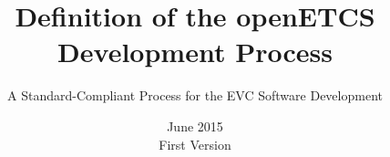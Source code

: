 \documentclass{template/openetcs_article}
\begin{document}
\frontmatter
{}



\newcommand{\nl}{\mbox{}\\}

\newcommand{\nthng}[1]{}

\newcommand{\oldtext}[1]{\textbf{OLD:} {\em #1} \textbf{DLO}}

\newcommand{\cmmnt}[1]{\fbox{#1}}

\newcommand{\bgcmmnt}[1]{\nl\framebox{\parbox{.95\textwidth}{#1}}\nl[2mm]}

\newcommand{\qq}[1]{?`#1?}

\newcommand{\tbd}{\cmmnt{tbd}}






\title{Definition of the openETCS Development Process}

\subtitle{A Standard-Compliant Process for the EVC Software Development}

\date{June 2015\\
First Version}



\end{document}
